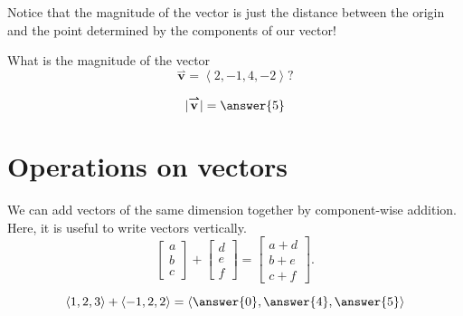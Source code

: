 \documentclass{ximera}
\renewcommand{\vec}[1]{{\overset{\boldsymbol{\rightharpoonup}}{\mathbf{#1}}}}
\renewcommand{\vector}[1]{\left\langle #1\right\rangle}
\begin{document}
Notice that the magnitude of the vector is just the distance between 
the origin and the point determined by the components of our vector!

\begin{question}
  What is the magnitude of the vector
  \[
  \vec{v}=\vector{2,-1,4,-2}?
  \]
  \begin{prompt}
    \[
    |\vec{v}|=\answer{5}
    \]
  \end{prompt}
\end{question}




\section{Operations on vectors}


We can add vectors of the same dimension together by component-wise
addition. Here, it is useful to write vectors vertically.
\[
\begin{bmatrix}
  a\\
  b\\
  c
\end{bmatrix}
+
\begin{bmatrix}
  d\\
  e\\
  f
\end{bmatrix}
=
\begin{bmatrix}
  a+d\\
  b+e\\
  c+f
\end{bmatrix}.
\]

\begin{question}
  \[
  \vector{1,2,3}+ \vector{-1,2,2} =
  \vector{\answer{0},\answer{4},\answer{5}}
  \]
\end{question}
\end{document}
